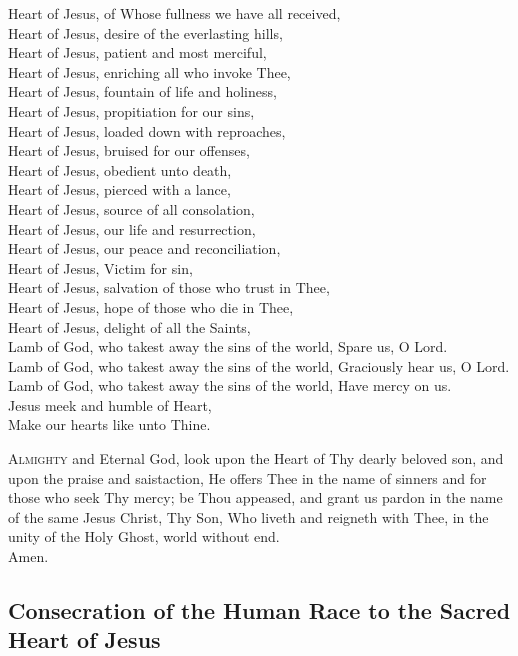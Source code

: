 \documentclass[statementpaper, 11pt]{memoir}
\begin{document}
Heart of Jesus, of Whose fullness we have all received,\\
Heart of Jesus, desire of the everlasting hills,\\
Heart of Jesus, patient and most merciful,\\
Heart of Jesus, enriching all who invoke Thee,\\
Heart of Jesus, fountain of life and holiness,\\
Heart of Jesus, propitiation for our sins,\\
Heart of Jesus, loaded down with reproaches,\\
Heart of Jesus, bruised for our offenses,\\
Heart of Jesus, obedient unto death,\\
Heart of Jesus, pierced with a lance,\\
Heart of Jesus, source of all consolation,\\
Heart of Jesus, our life and resurrection,\\
Heart of Jesus, our peace and reconciliation,\\
Heart of Jesus, Victim for sin,\\
Heart of Jesus, salvation of those who trust in Thee,\\
Heart of Jesus, hope of those who die in Thee,\\
Heart of Jesus, delight of all the Saints,\\
Lamb of God, who takest away the sins of the world, Spare us, O Lord.\\
Lamb of God, who takest away the sins of the world, Graciously hear us, O Lord.\\
Lamb of God, who takest away the sins of the world, Have mercy on us.\\
\vbar Jesus meek and humble of Heart, \\
\rbar Make our hearts like unto Thine.


\lettrine{A}{lmighty} and Eternal God, look upon the Heart of Thy dearly beloved son, and
upon the praise and saistaction, He offers Thee in the name of sinners and for
those who seek Thy mercy; be Thou appeased, and grant us pardon in the name of
the same Jesus Christ, Thy Son, Who liveth and reigneth with Thee, in the unity
of the Holy Ghost, world without end.\\
\rbar Amen.

\subsection{Consecration of the Human Race to the Sacred Heart of Jesus}
\end{document}
